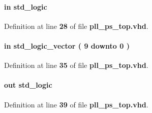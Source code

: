 \paragraph[{ps\+\_\+mode}]{ {\bfseries \textcolor{keywordflow}{in}\textcolor{vhdlchar}{ }} {\bfseries \textcolor{comment}{std\+\_\+logic}\textcolor{vhdlchar}{ }} \hspace{0.3cm}{\ttfamily [Port]}}\label{classpll__ps__top_a5556b8a97551799fcf9cfa1e20b29158}


Definition at line {\bf 28} of file {\bf pll\+\_\+ps\+\_\+top.\+vhd}.

\paragraph[{ps\+\_\+phase}]{ {\bfseries \textcolor{keywordflow}{in}\textcolor{vhdlchar}{ }} {\bfseries \textcolor{comment}{std\+\_\+logic\+\_\+vector}\textcolor{vhdlchar}{ }\textcolor{vhdlchar}{(}\textcolor{vhdlchar}{ }\textcolor{vhdlchar}{ } \textcolor{vhdldigit}{9} \textcolor{vhdlchar}{ }\textcolor{keywordflow}{downto}\textcolor{vhdlchar}{ }\textcolor{vhdlchar}{ } \textcolor{vhdldigit}{0} \textcolor{vhdlchar}{ }\textcolor{vhdlchar}{)}\textcolor{vhdlchar}{ }} \hspace{0.3cm}{\ttfamily [Port]}}\label{classpll__ps__top_ad76ece4db942153a987ea8b185d47150}


Definition at line {\bf 35} of file {\bf pll\+\_\+ps\+\_\+top.\+vhd}.

\paragraph[{ps\+\_\+status}]{ {\bfseries \textcolor{keywordflow}{out}\textcolor{vhdlchar}{ }} {\bfseries \textcolor{comment}{std\+\_\+logic}\textcolor{vhdlchar}{ }} \hspace{0.3cm}{\ttfamily [Port]}}\label{classpll__ps__top_a21027ab5b999af88a1e5c47445dca25e}


Definition at line {\bf 39} of file {\bf pll\+\_\+ps\+\_\+top.\+vhd}.

